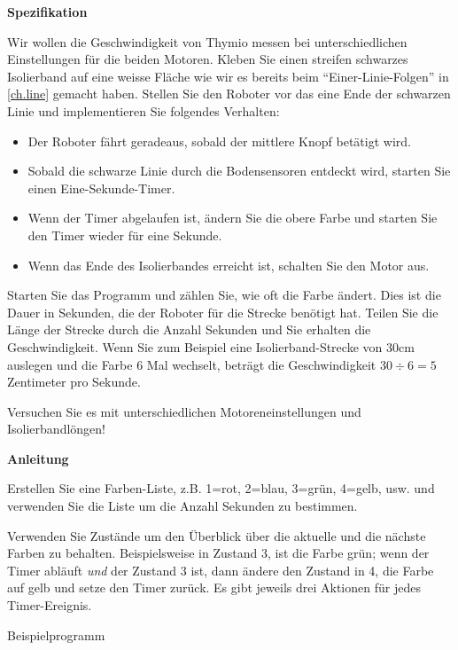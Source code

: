 \label{ch.speed}

\textbf{Spezifikation}

Wir wollen die Geschwindigkeit von Thymio messen bei unterschiedlichen Einstellungen für die beiden Motoren. Kleben Sie einen streifen schwarzes Isolierband auf eine weisse Fläche wie wir es bereits beim ``Einer-Linie-Folgen'' in \cref{ch.line} gemacht haben. Stellen Sie den Roboter vor das eine Ende der schwarzen Linie und implementieren Sie folgendes Verhalten:

\begin{itemize}

\item Der Roboter fährt geradeaus, sobald der mittlere Knopf betätigt wird.

\item Sobald die schwarze Linie durch die Bodensensoren entdeckt wird, starten Sie einen Eine-Sekunde-Timer. 

\item Wenn der Timer abgelaufen ist, ändern Sie die obere Farbe und starten Sie den Timer wieder für eine Sekunde. 

\item Wenn das Ende des Isolierbandes erreicht ist, schalten Sie den Motor aus. 

\end{itemize} 

Starten Sie das Programm und zählen Sie, wie oft die Farbe ändert. Dies ist die Dauer in Sekunden, die der Roboter für die Strecke benötigt hat. Teilen Sie die Länge der Strecke durch die Anzahl Sekunden und Sie erhalten die Geschwindigkeit. Wenn Sie zum Beispiel eine Isolierband-Strecke von 30cm auslegen und die Farbe 6 Mal wechselt, beträgt die Geschwindigkeit $30 \div 6 = 5$ Zentimeter pro Sekunde. 

Versuchen Sie es mit unterschiedlichen Motoreneinstellungen und Isolierbandlöngen!

\textbf{Anleitung}

Erstellen Sie eine Farben-Liste, z.B. 1=rot, 2=blau, 3=grün, 4=gelb, usw. und verwenden Sie die Liste um die Anzahl Sekunden zu bestimmen.

Verwenden Sie Zustände um den Überblick über die aktuelle und die nächste Farben zu behalten. Beispielsweise in Zustand 3, ist die Farbe grün; wenn der Timer abläuft \emph{und} der Zustand 3 ist, dann ändere den Zustand in 4, die Farbe auf gelb und setze den Timer zurück. Es gibt jeweils drei Aktionen für jedes Timer-Ereignis.

\bigskip

{\raggedleft \hfill Beispielprogramm }
